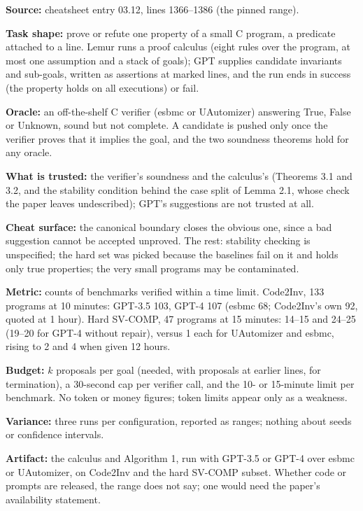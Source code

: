 \documentclass[11pt]{article}
\begin{document}
\begin{answer}
\textbf{Source:} cheatsheet entry 03.12, lines 1366--1386 (the pinned range).

\textbf{Task shape:} prove or refute one property of a small C program, a
predicate attached to a line. Lemur runs a proof calculus (eight rules over
the program, at most one assumption and a stack of goals); GPT supplies
candidate invariants and sub-goals, written as assertions at marked lines,
and the run ends in success (the property holds on all executions) or fail.

\textbf{Oracle:} an off-the-shelf C verifier (esbmc or UAutomizer) answering
True, False or Unknown, sound but not complete. A candidate is pushed only
once the verifier proves that it implies the goal, and the two soundness
theorems hold for any oracle.

\textbf{What is trusted:} the verifier's soundness and the calculus's
(Theorems 3.1 and 3.2, and the stability condition behind the case split of
Lemma 2.1, whose check the paper leaves undescribed); GPT's suggestions are
not trusted at all.

\textbf{Cheat surface:} the canonical boundary closes the obvious one, since a
bad suggestion cannot be accepted unproved. The rest: stability checking is
unspecified; the hard set was picked because the baselines fail on it and
holds only true properties; the very small programs may be contaminated.

\textbf{Metric:} counts of benchmarks verified within a time limit. Code2Inv,
133 programs at 10 minutes: GPT-3.5 103, GPT-4 107 (esbmc 68; Code2Inv's own
92, quoted at 1 hour). Hard SV-COMP, 47 programs at 15 minutes: 14--15 and
24--25 (19--20 for GPT-4 without repair), versus 1 each for UAutomizer and
esbmc, rising to 2 and 4 when given 12 hours.

\textbf{Budget:} $k$ proposals per goal (needed, with proposals at earlier
lines, for termination), a 30-second cap per verifier call, and the 10- or
15-minute limit per benchmark. No token or money figures; token limits appear
only as a weakness.

\textbf{Variance:} three runs per configuration, reported as ranges; nothing
about seeds or confidence intervals.

\textbf{Artifact:} the calculus and Algorithm 1, run with GPT-3.5 or GPT-4 over
esbmc or UAutomizer, on Code2Inv and the hard SV-COMP subset. Whether code or
prompts are released, the range does not say; one would need the paper's
availability statement.
\end{answer}
\end{document}
